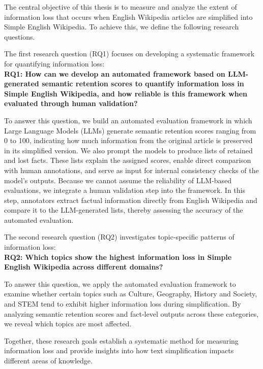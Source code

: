\documentclass{DESSThesis}
\begin{document}
The central objective of this thesis is to measure and analyze the extent of information loss that occurs when English Wikipedia articles are simplified into Simple English Wikipedia. To achieve this, we define the following research questions.

The first research question (RQ1) focuses on developing a systematic framework for quantifying information loss: \hfill\\
\indent \textbf{RQ1: How can we develop an automated framework based on LLM-generated semantic retention scores to quantify information loss in Simple English Wikipedia, and how reliable is this framework when evaluated through human validation?}

To answer this question, we build an automated evaluation framework in which Large Language Models (LLMs) generate semantic retention scores ranging from 0 to 100, indicating how much information from the original article is preserved in its simplified version. We also prompt the models to produce lists of retained and lost facts. These lists explain the assigned scores, enable direct comparison with human annotations, and serve as input for internal consistency checks of the model’s outputs. Because we cannot assume the reliability of LLM-based evaluations, we integrate a human validation step into the framework. In this step, annotators extract factual information directly from English Wikipedia and compare it to the LLM-generated lists, thereby assessing the accuracy of the automated evaluation.

The second research question (RQ2) investigates topic-specific patterns of information loss: \hfill\\
\indent \textbf{RQ2: Which topics show the highest information loss in Simple English Wikipedia across different domains?}

To answer this question, we apply the automated evaluation framework to examine whether certain topics such as Culture, Geography, History and Society, and STEM tend to exhibit higher information loss during simplification. By analyzing semantic retention scores and fact-level outputs across these categories, we reveal which topics are most affected.

Together, these research goals establish a systematic method for measuring information loss and provide insights into how text simplification impacts different areas of knowledge.
\end{document}
